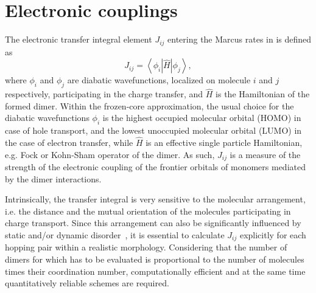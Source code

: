 \chapter{Electronic couplings}
\label{sec:transfer_integrals}

The electronic transfer integral element $J_{ij}$ entering the Marcus rates in  is defined as
\begin{equation}
   J_{ij} = \left\langle \phi_i \left\vert \hat{H} \right\vert \phi_j \right\rangle ,
\label{equ:TI}
\end{equation}
where $\phi_i$ and $\phi_j$ are diabatic wavefunctions, localized on molecule $i$ and $j$ respectively, participating in the charge transfer, and $\hat{H}$ is the Hamiltonian of the formed dimer. Within the frozen-core approximation, the usual choice for the diabatic wavefunctions $\phi_i$ is the highest occupied molecular orbital (HOMO) in case of hole transport, and the lowest unoccupied molecular orbital (LUMO) in the case of electron transfer, while $\hat{H}$ is an effective single particle Hamiltonian, e.g. Fock or Kohn-Sham operator of the dimer. As such, $J_{ij}$ is a measure of the strength of the electronic coupling of the frontier orbitals of monomers mediated by the dimer interactions. 

Intrinsically, the transfer integral is very sensitive to the molecular arrangement, i.e. the distance and the mutual orientation of the molecules participating in charge transport. Since this arrangement can also be significantly influenced by static and/or dynamic disorder~\cite{baessler_charge_1993,troisi_charge-transport_2006,troisi_charge_2009,mcmahon_organic_2010,vehoff_charge_2010},
it is essential to calculate $J_{ij}$ explicitly for each hopping pair within a realistic morphology. Considering that the number of dimers for which  has to be evaluated is proportional to the number of molecules times their coordination number, computationally efficient and at the same time quantitatively reliable schemes are required.






